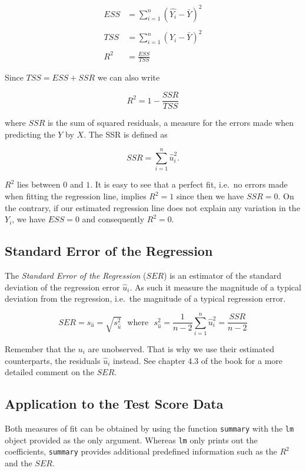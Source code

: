 \documentclass[]{book}
\theoremstyle{definition}
\theoremstyle{definition}
\theoremstyle{definition}
\theoremstyle{remark}
\begin{document}
\begin{align}
  ESS & =  \sum_{i = 1}^n \left( \hat{Y_i} - \bar{Y} \right)^2   \\
  \\
  TSS & =  \sum_{i = 1}^n \left( Y_i - \bar{Y} \right)^2   \\
  \\
  R^2 & = \frac{ESS}{TSS}
\end{align}

Since \(TSS = ESS + SSR\) we can also write

\[ R^2 = 1- \frac{SSR}{TSS} \]

where \(SSR\) is the sum of squared residuals, a measure for the errors
made when predicting the \(Y\) by \(X\). The SSR is defined as

\[ SSR = \sum_{i=1}^n \hat{u}_i^2. \]

\(R^2\) lies between \(0\) and \(1\). It is easy to see that a perfect
fit, i.e.~no errors made when fitting the regression line, implies
\(R^2 = 1\) since then we have \(SSR=0\). On the contrary, if our
estimated regression line does not explain any variation in the \(Y_i\),
we have \(ESS=0\) and consequently \(R^2=0\).

\subsection{Standard Error of the
Regression}\label{standard-error-of-the-regression}

The \emph{Standard Error of the Regression} (\(SER\)) is an estimator of
the standard deviation of the regression error \(\hat{u}_i\). As such it
measure the magnitude of a typical deviation from the regression,
i.e.~the magnitude of a typical regression error.

\[ SER = s_{\hat{u}} = \sqrt{s_{\hat{u}}^2} \ \ \ \text{where} \ \ \ s_{\hat{u} }^2 = \frac{1}{n-2} \sum_{i = 1}^n \hat{u}^2_i = \frac{SSR}{n - 2} \]

Remember that the \(u_i\) are unobserved. That is why we use their
estimated counterparts, the residuals \(\hat{u}_i\) instead. See chapter
4.3 of the book for a more detailed comment on the \(SER\).

\subsection{Application to the Test Score
Data}\label{application-to-the-test-score-data}

Both measures of fit can be obtained by using the function
\texttt{summary} with the \texttt{lm} object provided as the only
argument. Whereas \texttt{lm} only prints out the coefficients,
\texttt{summary} provides additional predefined information such as the
\(R^2\) and the \(SER\).
\end{document}
